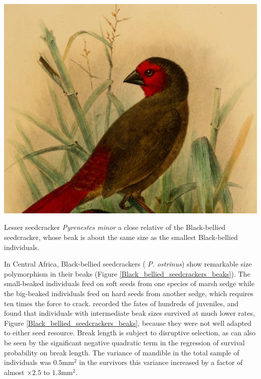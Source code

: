 \begin{marginfigure}
\begin{center}
\includegraphics[width= \textwidth]{illustration_images/Quant_gen/Pyrenestes_seedcracker/Pyrenestes_minor.jpg}
\end{center}
\caption{Lesser seedcracker {\it Pyrenestes minor} a close relative of
  the Black-bellied seedcracker, whose beak is about the same size as
  the smallest Black-bellied individuals.  }  
\end{marginfigure}
In Central Africa, Black-bellied seedcrackers ({\it
  P. ostrinus}) show remarkable size polymorphism in their
beaks (Figure \ref{Black_bellied_seedcrackers_beaks}).  The small-beaked individuals feed on
soft  seeds from one species of marsh sedge while the big-beaked
individuals feed on hard seeds from another sedge, which
requires ten times the force to crack.  \citet{smith1993disruptive}
recorded the fates of hundreds of juveniles, and found that
individuals with intermediate beak sizes survived at much lower rates,
Figure \ref{Black_bellied_seedcrackers_beaks}, because they were not
well adapted to either seed resource.  Break length is subject to
disruptive selection, as can also be seen by the significant negative quadratic
term in the regression of survival probability on break length. The variance of mandible in the total sample of individuals was
$0.5$mm$^2$ in the survivors this variance increased by a factor of
almost $\times 2.5$ to $1.3$mm$^2$.  

